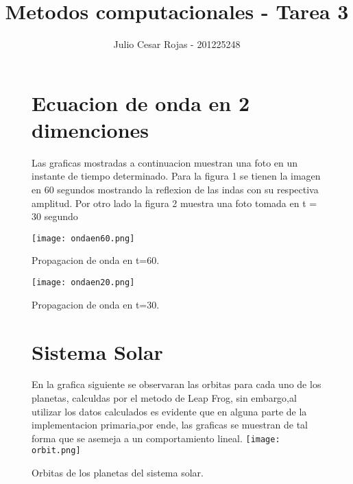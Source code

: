 \documentclass[a4paper]{article}
\title{Metodos computacionales - Tarea 3}
\author{Julio Cesar Rojas - 201225248}
\begin{document}
\maketitle
\begin{figure}
\section{Ecuacion de onda en 2 dimenciones}
Las graficas mostradas a continuacion muestran una foto en un instante de tiempo determinado. Para la figura 1 se tienen la imagen en 60 segundos mostrando la reflexion de las indas con su respectiva amplitud. Por otro lado la figura 2 muestra una foto tomada en t = 30 segundo

\centering
\texttt{[image: ondaen60.png]}
\caption{\label{fig:60}Propagacion de onda en t=60.}
\end{figure}

\begin{figure}
\centering
\texttt{[image: ondaen20.png]}
\caption{\label{fig:30}Propagacion de onda en t=30.}
\end{figure}


\begin{figure}
\section{Sistema Solar}
En la grafica siguiente se observaran las orbitas para cada uno de los planetas, calculdas por el metodo de Leap Frog, sin embargo,al utilizar los datos calculados es evidente que en alguna parte de la implementacion primaria,por ende, las graficas se muestran de tal forma que se asemeja a un comportamiento lineal.
\centering
\texttt{[image: orbit.png]}
\caption{\label{fig:Orbitas}Orbitas de los planetas del sistema solar.}
\end{figure}
\end{document}
